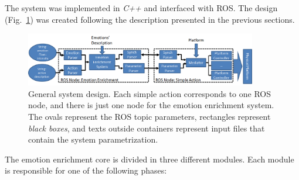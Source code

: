 The system was implemented in \textit{C++} and interfaced with ROS. The design (Fig.~\ref{fig:system_architecture}) was created following the description presented in the previous sections. 
\begin{figure}
	\centering
	\includegraphics[width=0.9\textwidth]{Images/SystemArchitecture.png} 	
	\caption{General system design. Each simple action corresponds to one ROS node, and there is just one node for the emotion enrichment system. The ovals represent the ROS topic parameters, rectangles represent \textit{black boxes}, and texts outside containers represent input files that contain the system parametrization.}
	\label{fig:system_architecture}
\end{figure}
The emotion enrichment core is divided in three different modules. 
Each module is responsible for one of the following phases:
